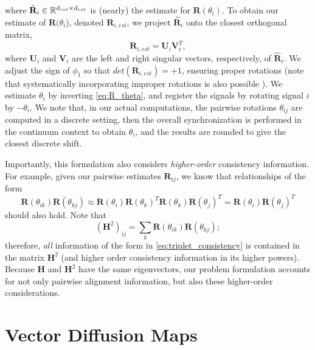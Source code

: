 where $\hat{\mathbf{R}}_i \in \mathbb{R}^{d_{rot} \times d_{rot}}$ is (nearly) the estimate for $\mathbf{R}(\theta_i)$.
%
To obtain our estimate of $\mathbf{R}(\theta_i$), denoted $\mathbf{R}_{i, est}$, we project $\hat{\mathbf{R}}_i$ onto the closest orthogonal matrix,
\begin{equation} \label{eq:R_est}
\mathbf{R}_{i, est} = \mathbf{U}_i \mathbf{V}_i^T,
\end{equation}
where $\mathbf{U}_i$ and $\mathbf{V}_i$ are the left and right singular vectors, respectively, of $\hat{\mathbf{R}}_i$.
%
We adjust the sign of $\phi_1$ so that $det(\mathbf{R}_{i, est}) = +1$, ensuring proper rotations 
(note that systematically incorporating improper rotations is also possible \citep{goemans1995improved, bandeira2013cheeger}).
%
We estimate $\theta_{i}$ by inverting \eqref{eq:R_theta}, and register the signals by rotating signal $i$ by $-\theta_i$.
%
We note that, in our actual computations, the pairwise rotations $\theta_{ij}$ are computed in a discrete setting, then the overall
synchronization is performed in the continuum context to obtain $\theta_i$, and the results are rounded to give the closest
discrete shift.

Importantly, this formulation also considers {\it higher-order} consistency information.
%
For example, given our pairwise estimates $\mathbf{R}_{ij}$, we know that relationships of the form
\begin{equation} \label{eq:triplet_consistency}
\mathbf{R}(\theta_{ik}) \mathbf{R}(\theta_{kj}) \approx \mathbf{R}(\theta_i) \mathbf{R}(\theta_k)^T \mathbf{R}(\theta_k) \mathbf{R}(\theta_j)^T = \mathbf{R}(\theta_i) \mathbf{R}(\theta_j)^T
\end{equation}
should also hold.
%
Note that
\begin{equation}
(\mathbf{H}^2)_{ij} = \sum_k \mathbf{R}(\theta_{ik}) \mathbf{R}(\theta_{kj});
\end{equation}
therefore, {\it all} information of the form in \eqref{eq:triplet_consistency} is contained in the matrix $\mathbf{H}^2$ (and higher order
consistency information in its higher powers).
%
Because $\mathbf{H}$ and $\mathbf{H}^2$ have the same eigenvectors, our problem formulation accounts for not only pairwise alignment information, but also these higher-order considerations.

\section{Vector Diffusion Maps}

